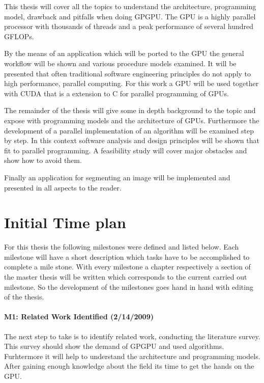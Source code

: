 This thesis will cover all the topics to understand the architecture,
programming model, drawback and pitfalls when doing \gls{GPGPU}. The \gls{GPU}
is a highly parallel processor with thousands of threads and a peak performance
of several hundred \glspl{GFLOP}.

By the means of an application which will be ported to the \gls{GPU} the general
workflow will be shown and various procedure models examined. It will be
presented that often traditional software engineering principles do not apply to
high performance, parallel computing. For this work a  \gls{GPU}
will be used together with \gls{CUDA} that is a extension to C for parallel
programming of \glspl{GPU}.

The remainder of the thesis will give some in depth background to the topic and
expose with programming models and the architecture of \glspl{GPU}. Furthermore the
development of a parallel implementation of an algorithm will be examined step
by step. In this context software analysis and design principles will be shown
that fit to parallel programming. A feasibility study will cover major obstacles
and show how to avoid them.

Finally an application for segmenting an image will be implemented and presented
in all aspects to the reader.

\section{Initial Time plan} 
\label{sub:time_plan} 
For this thesis the following milestones were defined and listed below. Each
milestone will have a short description which tasks have to be accomplished to
complete a mile stone. With every milestone a chapter respectively a section of
the master thesis will be written which corresponds to the current carried out
milestone. So the development of the milestones goes hand in hand with editing
of the thesis.

\paragraph{M1: Related Work Identified (2/14/2009)} %
\label{par:m1_related_work_identified}
The next step to take is to identify related work, conducting the literature 
survey. This survey should show the demand of GPGPU and used algorithms. 
Furhtermore it will help to understand the architecture and programming models. 
After gaining enough knowledge about the field its time to get the hands on the 
GPU.
